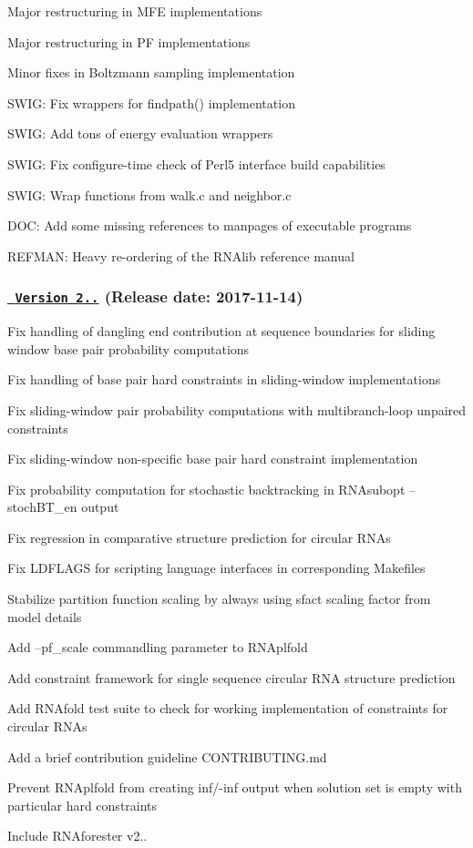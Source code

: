 \begin{DoxyItemize}
\item Major restructuring in M\+FE implementations
\item Major restructuring in PF implementations
\item Minor fixes in Boltzmann sampling implementation
\item S\+W\+IG\+: Fix wrappers for findpath() implementation
\item S\+W\+IG\+: Add tons of energy evaluation wrappers
\item S\+W\+IG\+: Fix configure-\/time check of Perl5 interface build capabilities
\item S\+W\+IG\+: Wrap functions from walk.\+c and neighbor.\+c
\item D\+OC\+: Add some missing references to manpages of executable programs
\item R\+E\+F\+M\+AN\+: Heavy re-\/ordering of the R\+N\+Alib reference manual
\end{DoxyItemize}

\subsubsection*{\href{https://github.com/ViennaRNA/ViennaRNA/compare/v2.4.2...v2.4.3}{\texttt{ Version 2..}} (Release date\+: 2017-\/11-\/14)}


\begin{DoxyItemize}
\item Fix handling of dangling end contribution at sequence boundaries for sliding window base pair probability computations
\item Fix handling of base pair hard constraints in sliding-\/window implementations
\item Fix sliding-\/window pair probability computations with multibranch-\/loop unpaired constraints
\item Fix sliding-\/window non-\/specific base pair hard constraint implementation
\item Fix probability computation for stochastic backtracking in R\+N\+Asubopt --stoch\+B\+T\+\_\+en output
\item Fix regression in comparative structure prediction for circular R\+N\+As
\item Fix L\+D\+F\+L\+A\+GS for scripting language interfaces in corresponding Makefiles
\item Stabilize partition function scaling by always using sfact scaling factor from model details
\item Add --pf\+\_\+scale commandling parameter to R\+N\+Aplfold
\item Add constraint framework for single sequence circular R\+NA structure prediction
\item Add R\+N\+Afold test suite to check for working implementation of constraints for circular R\+N\+As
\item Add a brief contribution guideline C\+O\+N\+T\+R\+I\+B\+U\+T\+I\+N\+G.\+md
\item Prevent R\+N\+Aplfold from creating inf/-\/inf output when solution set is empty with particular hard constraints
\item Include R\+N\+Aforester v2..
\end{DoxyItemize}

